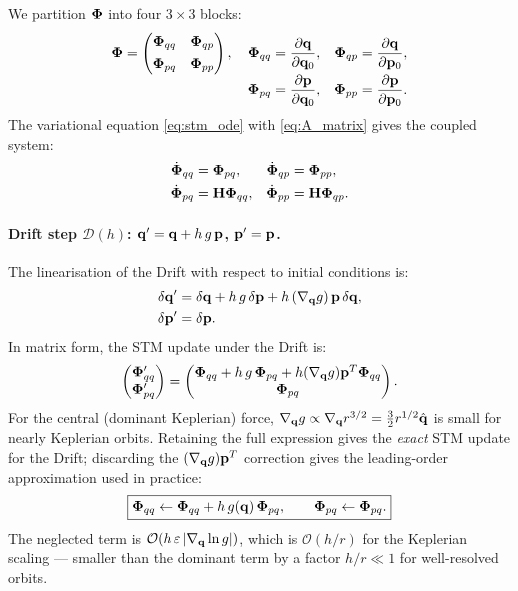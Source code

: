 We partition $\boldsymbol{\Phi}$ into four $3\times3$ blocks:
\begin{equation}
  \boldsymbol{\Phi} =
  \begin{pmatrix}
    \boldsymbol{\Phi}_{qq} & \boldsymbol{\Phi}_{qp} \\[4pt]
    \boldsymbol{\Phi}_{pq} & \boldsymbol{\Phi}_{pp}
  \end{pmatrix},
  \quad
  \begin{aligned}[t]
    \boldsymbol{\Phi}_{qq} &= \frac{\partial\mathbf{q}}{\partial\mathbf{q}_0},
    &\boldsymbol{\Phi}_{qp} &= \frac{\partial\mathbf{q}}{\partial\mathbf{p}_0}, \\
    \boldsymbol{\Phi}_{pq} &= \frac{\partial\mathbf{p}}{\partial\mathbf{q}_0},
    &\boldsymbol{\Phi}_{pp} &= \frac{\partial\mathbf{p}}{\partial\mathbf{p}_0}.
  \end{aligned}
  \label{eq:stm_blocks}
\end{equation}
The variational equation \eqref{eq:stm_ode} with
\eqref{eq:A_matrix} gives the coupled system:
\begin{align}
  \dot{\boldsymbol{\Phi}}_{qq} &= \boldsymbol{\Phi}_{pq},   & \dot{\boldsymbol{\Phi}}_{qp} &= \boldsymbol{\Phi}_{pp}, \\
  \dot{\boldsymbol{\Phi}}_{pq} &= \mathbf{H}\boldsymbol{\Phi}_{qq}, & \dot{\boldsymbol{\Phi}}_{pp} &= \mathbf{H}\boldsymbol{\Phi}_{qp}.
  \label{eq:stm_system}
\end{align}

\paragraph{Drift step $\mathcal{D}(h)$: $\mathbf{q}' = \mathbf{q} + h\,g\,\mathbf{p}$, $\mathbf{p}' = \mathbf{p}$.}
The linearisation of the Drift with respect to initial conditions is:
\begin{align}
  \delta\mathbf{q}' &= \delta\mathbf{q} + h\,g\,\delta\mathbf{p}
              + h\,(\nabla_{\mathbf{q}} g)\,\mathbf{p}\,\delta\mathbf{q}, \\
  \delta\mathbf{p}' &= \delta\mathbf{p}.
\end{align}
In matrix form, the STM update under the Drift is:
\begin{equation}
  \begin{pmatrix}\boldsymbol{\Phi}_{qq}' \\ \boldsymbol{\Phi}_{pq}'\end{pmatrix}
  =
  \begin{pmatrix}
    \boldsymbol{\Phi}_{qq} + h\,g\,\boldsymbol{\Phi}_{pq} + h(\nabla_{\mathbf{q}} g)\mathbf{p}^T\boldsymbol{\Phi}_{qq} \\
    \boldsymbol{\Phi}_{pq}
  \end{pmatrix}.
  \label{eq:stm_drift_full}
\end{equation}
For the central (dominant Keplerian) force, $\nabla_{\mathbf{q}} g \propto
\nabla_{\mathbf{q}} r^{3/2} = \frac{3}{2}r^{1/2}\hat{\mathbf{q}}$ is small
for nearly Keplerian orbits. Retaining the full expression gives
the \textit{exact} STM update for the Drift; discarding the
$(\nabla_{\mathbf{q}} g)\mathbf{p}^T$ correction gives the leading-order
approximation used in practice:
\begin{equation}
  \boxed{\boldsymbol{\Phi}_{qq} \leftarrow \boldsymbol{\Phi}_{qq} + h\,g(\mathbf{q})\,\boldsymbol{\Phi}_{pq},
  \qquad \boldsymbol{\Phi}_{pq} \leftarrow \boldsymbol{\Phi}_{pq}.}
  \label{eq:stm_drift_approx}
\end{equation}
The neglected term is $\mathcal{O}(h\,\varepsilon\,|\nabla_{\mathbf{q}}\ln g|)$,
which is $\mathcal{O}(h/r)$ for the Keplerian scaling — smaller
than the dominant term by a factor $h/r \ll 1$ for well-resolved orbits.

